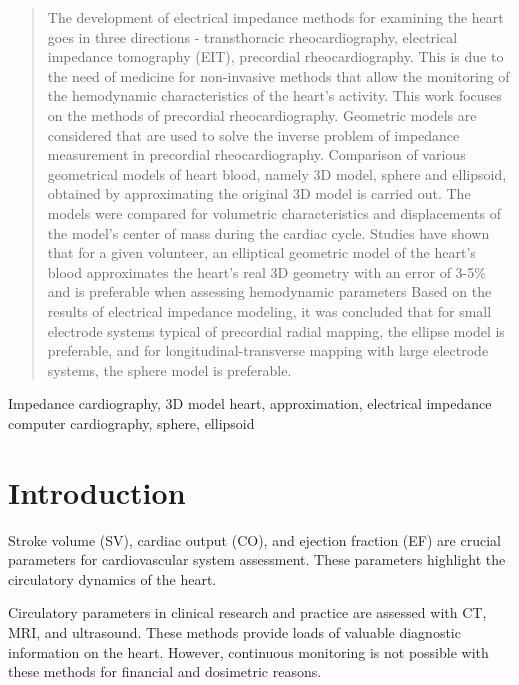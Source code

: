 \documentclass[conference]{IEEEtran}
\begin{document}
\begin{abstract}

    The development of electrical impedance methods for examining the heart goes in three directions - transthoracic rheocardiography,
    electrical impedance tomography (EIT), precordial rheocardiography. This is due to the need of medicine for non-invasive methods that allow the monitoring of the hemodynamic characteristics of the heart's activity.
    This work focuses on the methods of precordial rheocardiography. Geometric models are considered that are used to solve the inverse problem of impedance measurement in precordial rheocardiography.
    Comparison of various geometrical models of heart blood, namely 3D model, sphere and ellipsoid, obtained by approximating the original 3D model is carried out. The models were compared for volumetric characteristics and displacements of the model's center of mass during the cardiac cycle.
    Studies have shown that for a given volunteer, an elliptical geometric model of
    the heart's blood approximates the heart's real 3D geometry with an error of
    3-5\% and is preferable when assessing hemodynamic parameters
    Based on the results of electrical impedance modeling, it was concluded that for small electrode systems typical of precordial radial mapping, the ellipse model is preferable, and for longitudinal-transverse mapping with large electrode systems, the sphere model is preferable.



\end{abstract}

\begin{IEEEkeywords}
    Impedance cardiography, 3D model heart, approximation, electrical impedance computer cardiography, sphere, ellipsoid
\end{IEEEkeywords}

\section{Introduction}

Stroke volume (SV), cardiac output (CO), and ejection fraction (EF) are crucial
parameters for cardiovascular system assessment. These parameters highlight the circulatory
dynamics of the heart.

Circulatory parameters in clinical research and practice are assessed with CT,
MRI, and ultrasound. These methods provide loads of valuable diagnostic
information on the heart. However, continuous monitoring is not possible with
these methods for financial and dosimetric reasons.
\end{document}
